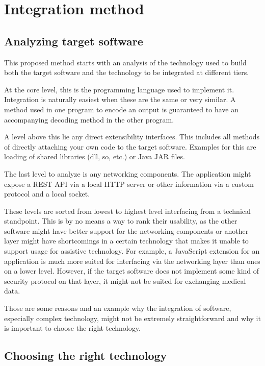 \documentclass[BSA,Bachelor,english]{twbook}%
\begin{document}
\newpage
\chapter{Integration method}

\section{Analyzing target software}
This proposed method starts with an analysis of the technology used to build both the target software and the technology to be integrated at different tiers.

At the core level, this is the programming language used to implement it. Integration is naturally easiest when these are the same or very similar. A method used in one program to encode an output is guaranteed to have an accompanying decoding method in the other program. 

A level above this lie any direct extensibility interfaces. This includes all methods of directly attaching your own code to the target software. Examples for this are loading of shared libraries (dll, so, etc.) or Java JAR files.

The last level to analyze is any networking components. The application might expose a REST API via a local HTTP server or other information via a custom protocol and a local socket.

These levels are sorted from lowest to highest level interfacing from a technical standpoint. This is by no means a way to rank their usability, as the other software might have better support for the networking components or another layer might have shortcomings in a certain technology that makes it unable to support usage for assistive technology. For example, a JavaScript extension for an application is much more suited for interfacing via the networking layer than ones on a lower level. However, if the target software does not implement some kind of security protocol on that layer, it might not be suited for exchanging medical data.

Those are some reasons and an example why the integration of software, especially complex technology, might not be extremely straightforward and why it is important to choose the right technology.

\section{Choosing the right technology}
\end{document}
